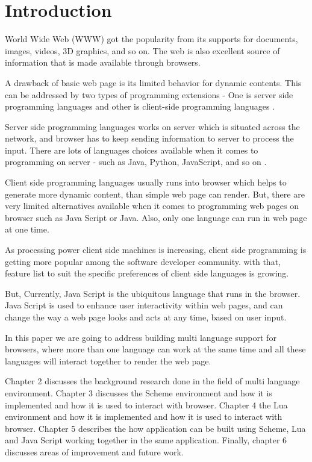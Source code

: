 \chapter{Introduction}
World Wide Web (WWW) got the popularity from its supports for documents, images, videos, 3D graphics, and so on. The web is also excellent source of information that is made available through browsers.

A drawback of basic web page is its limited behavior for dynamic contents. This can be addressed by two types of programming extensions -  One is server side programming languages and other is client-side programming languages \cite{LoginWeb}.

Server side programming languages works on server which is situated across the network, and browser has to keep sending information to server to process the input. There are lots of languages choices available when it comes to programming on server - such as Java, Python, JavaScript, and so on \cite{LoginWeb}.

Client side programming languages usually runs into browser which helps to generate more dynamic content, than simple web page can render. But, there are very limited alternatives available when it comes to programming web pages on browser such as Java Script or Java. Also, only one language can run in web page at one time.

As processing power client side machines is increasing, client side programming is getting more popular among the software developer community. with that, feature list to suit the specific preferences of client side languages is growing. 

But, Currently, Java Script is the ubiquitous language that runs in the browser. Java Script is used to enhance user interactivity within web pages, and can change the way a web page looks and acts at any time, based on user input.

In this paper we are going to address building multi language support for browsers, where more than one language can work at the same time and all these languages will interact together to render the web page. 


Chapter 2 discusses the background research done in the field of multi language environment. Chapter 3 discusses the Scheme environment and how it is implemented and how it is used to interact with browser. Chapter 4 the Lua environment and how it is implemented and how it is used to interact with browser. Chapter 5 describes the how application can be built using Scheme, Lua and Java Script working together in the same application. Finally, chapter 6 discusses areas of improvement and future work.


